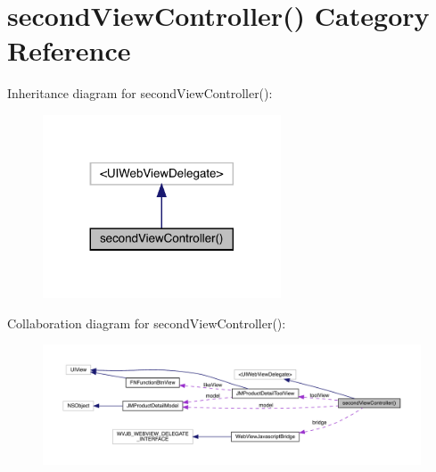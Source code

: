\hypertarget{categorysecond_view_controller_07_08}{}\section{second\+View\+Controller() Category Reference}
\label{categorysecond_view_controller_07_08}


Inheritance diagram for second\+View\+Controller()\+:\nopagebreak
\begin{figure}[H]
\begin{center}
\leavevmode
\includegraphics[width=200pt]{categorysecond_view_controller_07_08__inherit__graph}
\end{center}
\end{figure}


Collaboration diagram for second\+View\+Controller()\+:\nopagebreak
\begin{figure}[H]
\begin{center}
\leavevmode
\includegraphics[width=350pt]{categorysecond_view_controller_07_08__coll__graph}
\end{center}
\end{figure}
